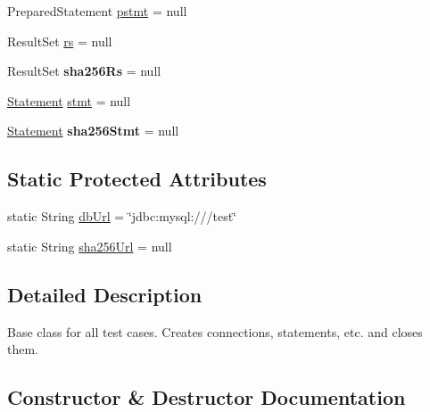 \begin{DoxyCompactItemize}
\item 
Prepared\+Statement \mbox{\hyperlink{classtestsuite_1_1_base_test_case_ad11201d39ce60fd541a261cac7d9a889}{pstmt}} = null
\item 
Result\+Set \mbox{\hyperlink{classtestsuite_1_1_base_test_case_a31fa73417c178b2baaf37ef1362e37d9}{rs}} = null
\item 
\mbox{\label{classtestsuite_1_1_base_test_case_a0b42d16fb351a34cb4c1f0119e93b5d1}} 
Result\+Set {\bfseries sha256\+Rs} = null
\item 
\mbox{\hyperlink{interfacecom_1_1mysql_1_1jdbc_1_1_statement}{Statement}} \mbox{\hyperlink{classtestsuite_1_1_base_test_case_a47db7db62d10e395144b1210dc7fd337}{stmt}} = null
\item 
\mbox{\label{classtestsuite_1_1_base_test_case_a774269ef0c9a559079dfeaf3be301d28}} 
\mbox{\hyperlink{interfacecom_1_1mysql_1_1jdbc_1_1_statement}{Statement}} {\bfseries sha256\+Stmt} = null
\end{DoxyCompactItemize}
\subsection*{Static Protected Attributes}
\begin{DoxyCompactItemize}
\item 
static String \mbox{\hyperlink{classtestsuite_1_1_base_test_case_abf615dd75e2b0bff6538d49bcc34541c}{db\+Url}} = \char`\"{}jdbc\+:mysql\+:///test\char`\"{}
\item 
static String \mbox{\hyperlink{classtestsuite_1_1_base_test_case_aa0a3676bf28f60f30f04e5ec95327ddd}{sha256\+Url}} = null
\end{DoxyCompactItemize}


\subsection{Detailed Description}
Base class for all test cases. Creates connections, statements, etc. and closes them. 

\subsection{Constructor \& Destructor Documentation}
\mbox{\label{classtestsuite_1_1_base_test_case_a353e63229f72905eb043169b6c2002b5}} 
